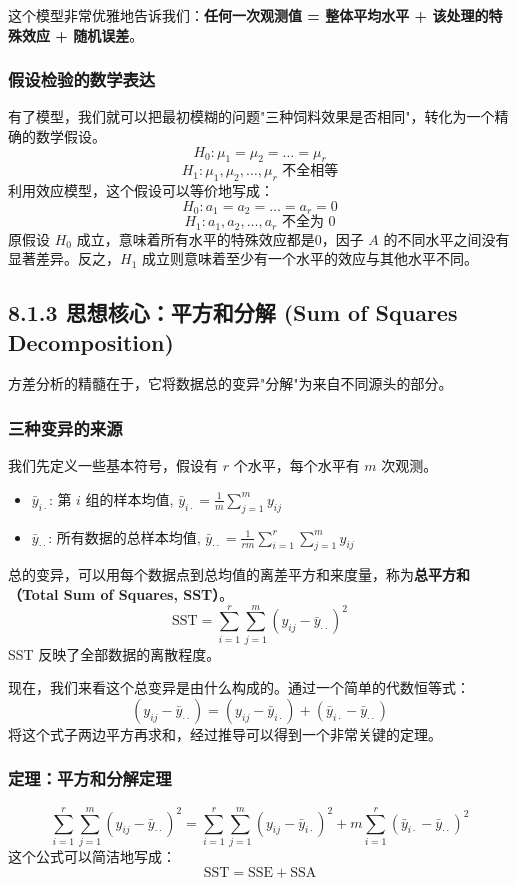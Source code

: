 \documentclass[12pt, a4paper]{amsart}
\begin{document}
这个模型非常优雅地告诉我们：\textbf{任何一次观测值 = 整体平均水平 + 该处理的特殊效应 + 随机误差}。

\subsubsection{假设检验的数学表达}
有了模型，我们就可以把最初模糊的问题"三种饲料效果是否相同"，转化为一个精确的数学假设。
$$ H_0: \mu_1 = \mu_2 = \dots = \mu_r $$
$$ H_1: \mu_1, \mu_2, \dots, \mu_r \text{ 不全相等} $$
利用效应模型，这个假设可以等价地写成：
$$ H_0: a_1 = a_2 = \dots = a_r = 0 $$
$$ H_1: a_1, a_2, \dots, a_r \text{ 不全为 0} $$
原假设 $H_0$ 成立，意味着所有水平的特殊效应都是0，因子 $A$ 的不同水平之间没有显著差异。反之，$H_1$ 成立则意味着至少有一个水平的效应与其他水平不同。

\subsection{8.1.3 思想核心：平方和分解 (Sum of Squares Decomposition)}
方差分析的精髓在于，它将数据总的变异"分解"为来自不同源头的部分。

\subsubsection{三种变异的来源}
我们先定义一些基本符号，假设有 $r$ 个水平，每个水平有 $m$ 次观测。
\begin{itemize}
    \item $\bar{y}_{i\cdot}$: 第 $i$ 组的样本均值, $\bar{y}_{i\cdot} = \frac{1}{m} \sum_{j=1}^{m} y_{ij}$
    \item $\bar{y}_{\cdot\cdot}$: 所有数据的总样本均值, $\bar{y}_{\cdot\cdot} = \frac{1}{rm} \sum_{i=1}^{r} \sum_{j=1}^{m} y_{ij}$
\end{itemize}

总的变异，可以用每个数据点到总均值的离差平方和来度量，称为\textbf{总平方和（Total Sum of Squares, SST）}。
$$ \text{SST} = \sum_{i=1}^{r} \sum_{j=1}^{m} (y_{ij} - \bar{y}_{\cdot\cdot})^2 $$
SST 反映了全部数据的离散程度。

现在，我们来看这个总变异是由什么构成的。通过一个简单的代数恒等式：
$$ (y_{ij} - \bar{y}_{\cdot\cdot}) = (y_{ij} - \bar{y}_{i\cdot}) + (\bar{y}_{i\cdot} - \bar{y}_{\cdot\cdot}) $$
将这个式子两边平方再求和，经过推导可以得到一个非常关键的定理。

\subsubsection{定理：平方和分解定理}
$$ \sum_{i=1}^{r} \sum_{j=1}^{m} (y_{ij} - \bar{y}_{\cdot\cdot})^2 = \sum_{i=1}^{r} \sum_{j=1}^{m} (y_{ij} - \bar{y}_{i\cdot})^2 + m \sum_{i=1}^{r} (\bar{y}_{i\cdot} - \bar{y}_{\cdot\cdot})^2 $$
这个公式可以简洁地写成：
$$ \text{SST} = \text{SSE} + \text{SSA} $$
\end{document}
